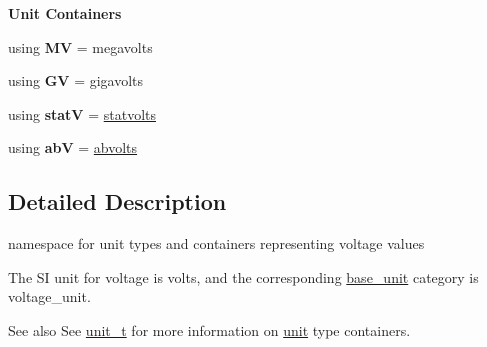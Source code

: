 \begin{Indent}{\bf Unit Containers}
\begin{DoxyCompactItemize}
\item 
\hypertarget{namespaceunits_1_1voltage_af9780bf0f468be5d90057c6eed241eec}{}using {\bfseries M\+V} = megavolts\label{namespaceunits_1_1voltage_af9780bf0f468be5d90057c6eed241eec}

\item 
\hypertarget{namespaceunits_1_1voltage_aa2db0ab898ff14faaedd5840df57496a}{}using {\bfseries G\+V} = gigavolts\label{namespaceunits_1_1voltage_aa2db0ab898ff14faaedd5840df57496a}

\item 
\hypertarget{namespaceunits_1_1voltage_ad08dad8882f023e043688e763e4b32df}{}using {\bfseries stat\+V} = \hyperlink{structunits_1_1unit}{statvolts}\label{namespaceunits_1_1voltage_ad08dad8882f023e043688e763e4b32df}

\item 
\hypertarget{namespaceunits_1_1voltage_a86e093d58dc69a10e66733b629149f86}{}using {\bfseries ab\+V} = \hyperlink{structunits_1_1unit}{abvolts}\label{namespaceunits_1_1voltage_a86e093d58dc69a10e66733b629149f86}

\end{DoxyCompactItemize}
\end{Indent}


\subsection{Detailed Description}
namespace for unit types and containers representing voltage values 

The S\+I unit for voltage is {\ttfamily volts}, and the corresponding {\ttfamily \hyperlink{structunits_1_1base__unit}{base\+\_\+unit}} category is {\ttfamily voltage\+\_\+unit}. \begin{DoxySeeAlso}{See also}
See \hyperlink{classunits_1_1unit__t}{unit\+\_\+t} for more information on \hyperlink{structunits_1_1unit}{unit} type containers. 
\end{DoxySeeAlso}
